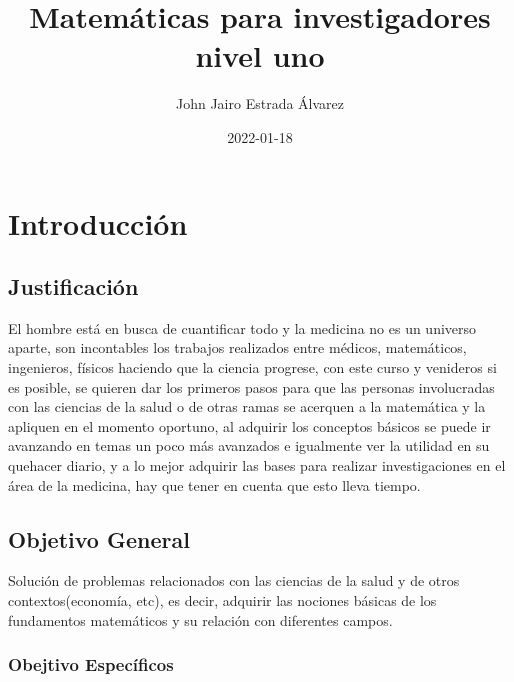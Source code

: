 \documentclass[
]{book}
\title{Matemáticas para investigadores nivel uno}
\author{John Jairo Estrada Álvarez}
\date{2022-01-18}
\begin{document}
\maketitle

{
\setcounter{tocdepth}{1}
\tableofcontents
}
\hypertarget{introducciuxf3n}{%
\chapter{Introducción}\label{introducciuxf3n}}

\hypertarget{ggb-elementSuperficieJJA2021}{}

\hypertarget{justificaciuxf3n}{%
\section{Justificación}\label{justificaciuxf3n}}

El hombre está en busca de cuantificar todo y la medicina no es un universo aparte, son incontables los trabajos realizados entre médicos, matemáticos, ingenieros, físicos haciendo que la ciencia progrese, con este curso y venideros si es posible, se quieren dar los primeros pasos para que las personas involucradas con las ciencias de la salud o de otras ramas se acerquen a la matemática y la apliquen en el momento oportuno, al adquirir los conceptos básicos se puede ir avanzando en temas un poco más avanzados e igualmente ver la utilidad en su quehacer diario, y a lo mejor adquirir las bases para realizar investigaciones en el área de la medicina, hay que tener en cuenta que esto lleva tiempo.

\hypertarget{objetivo-general}{%
\section{Objetivo General}\label{objetivo-general}}

Solución de problemas relacionados con las ciencias de la salud y de otros contextos(economía, etc), es decir, adquirir las nociones básicas de los fundamentos matemáticos y su relación con diferentes campos.

\hypertarget{obejtivo-especuxedficos}{%
\subsection{Obejtivo Específicos}\label{obejtivo-especuxedficos}}
\end{document}
